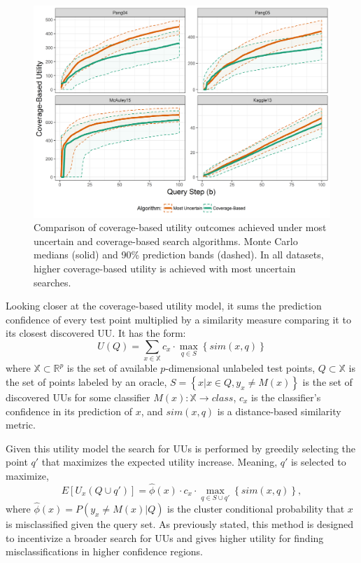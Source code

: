\documentclass[letterpaper]{article} %
\begin{document}
\begin{figure}[h!]
  \centering
  \includegraphics[width=\textwidth]{../experimentsAndPlots/CoverageVsMostUncertainPlaceholder.png}
  \caption{Comparison of coverage-based utility outcomes achieved under most uncertain and coverage-based search algorithms. Monte Carlo medians (solid) and 90\% prediction bands (dashed).  In all datasets, higher coverage-based utility is achieved with most uncertain searches.}
  \label{fig:coverutil}
\end{figure}

Looking closer at the coverage-based utility model, it sums the prediction confidence of every test point multiplied by a similarity measure comparing it to its closest discovered UU.  It has the form: $$U(Q) = \sum_{x \in \mathbb{X}} c_x \cdot \max_{q \in S} \left\{sim\left(x,q \right) \right\}$$ where $\mathbb{X} \subset \mathbb{R}^p$ is the set of available $p$-dimensional unlabeled test points, $Q \subset \mathbb{X}$ is the set of points labeled by an oracle, $S = \left\{x|x \in Q, y_x \neq M(x)\right\}$ is the set of discovered UUs for some classifier $M(x):\mathbb{X} \rightarrow class$, $c_x$ is the classifier's confidence in its prediction of $x$, and $sim(x,q)$ is a distance-based similarity metric. 

Given this utility model the search for UUs is performed by greedily selecting the point $q'$ that maximizes the expected utility increase.  Meaning, $q'$ is selected to maximize, $$E\left[U_x\left(Q \cup q'\right)\right] = \hat{\phi}(x) \cdot c_x \cdot \max_{q \in S \cup q'} \left\{sim\left(x,q \right) \right\},$$ where $\hat{\phi}(x) = P\left(y_x \neq M(x) |Q \right)$ is the cluster conditional probability that $x$ is misclassified given the query set.  As previously stated, this method is designed to incentivize a broader search for UUs and gives higher utility for finding misclassifications in higher confidence regions.  
\end{document}

